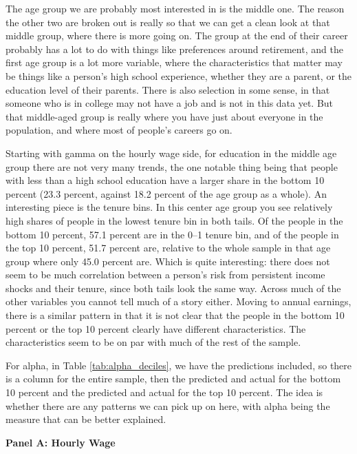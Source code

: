 \documentclass[12pt]{article}
\begin{document}
\begin{onehalfspace}
The age group we are probably most interested in is the middle one. The reason the other two are broken out is really so that we can get a clean look at that middle group, where there is more going on. The group at the end of their career probably has a lot to do with things like preferences around retirement, and the first age group is a lot more variable, where the characteristics that matter may be things like a person's high school experience, whether they are a parent, or the education level of their parents. There is also selection in some sense, in that someone who is in college may not have a job and is not in this data yet. But that middle-aged group is really where you have just about everyone in the population, and where most of people's careers go on.

Starting with gamma on the hourly wage side, for education in the middle age group there are not very many trends, the one notable thing being that people with less than a high school education have a larger share in the bottom 10 percent (23.3 percent, against 18.2 percent of the age group as a whole). An interesting piece is the tenure bins. In this center age group you see relatively high shares of people in the lowest tenure bin in both tails. Of the people in the bottom 10 percent, 57.1 percent are in the 0--1 tenure bin, and of the people in the top 10 percent, 51.7 percent are, relative to the whole sample in that age group where only 45.0 percent are. Which is quite interesting: there does not seem to be much correlation between a person's risk from persistent income shocks and their tenure, since both tails look the same way. Across much of the other variables you cannot tell much of a story either. Moving to annual earnings, there is a similar pattern in that it is not clear that the people in the bottom 10 percent or the top 10 percent clearly have different characteristics. The characteristics seem to be on par with much of the rest of the sample.

For alpha, in Table \ref{tab:alpha_deciles}, we have the predictions included, so there is a column for the entire sample, then the predicted and actual for the bottom 10 percent and the predicted and actual for the top 10 percent. The idea is whether there are any patterns we can pick up on here, with alpha being the measure that can be better explained.

\begin{table}[H]
    \centering
    \caption{Characteristics of Top and Bottom Risk Deciles by Age, Alpha (Sorted by Ensemble-Predicted and Actual Risk; Percent Shares)}
    \label{tab:alpha_deciles}
    \textbf{Panel A: Hourly Wage}\\[4pt]
    \resizebox*{!}{0.41\textheight}{%
        
    }


\end{table}
\end{onehalfspace}
\end{document}
